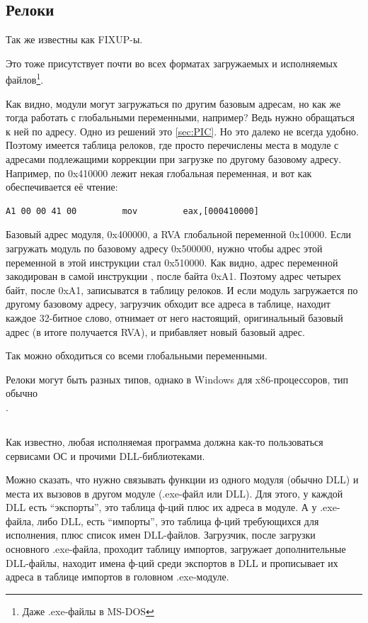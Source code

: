 \subsection{Релоки}

Так же известны как FIXUP-ы.

Это тоже присутствует почти во всех форматах загружаемых и исполняемых файлов\footnote{Даже .exe-файлы в MS-DOS}.

Как видно, модули могут загружаться по другим базовым адресам, но как же тогда работать с глобальными переменными,
например? Ведь нужно обращаться к ней по адресу. Одно из решений это \PICcode\ref{sec:PIC}. 
Но это далеко не всегда удобно.
Поэтому имеется таблица релоков, где просто перечислены места в модуле с адресами подлежащими коррекции при загрузке
по другому базовому адресу.
Например, по 0x410000 лежит некая глобальная переменная, и вот как обеспечивается её чтение:

\begin{lstlisting}
A1 00 00 41 00         mov         eax,[000410000]
\end{lstlisting}

Базовый адрес модуля, 0x400000, а \ac{RVA} глобальной переменной 0x10000. Если загружать модуль по базовому адресу
0x500000, нужно чтобы адрес этой переменной в этой инструкции стал 0x510000. Как видно, адрес переменной закодирован
в самой инструкции , после байта 0xA1. Поэтому адрес четырех байт, после 0xA1, записыватся в таблицу релоков.
И если модуль загружается по другому базовому адресу, загрузчик обходит все адреса в таблице, находит каждое 32-битное
слово, отнимает от него настоящий, оригинальный базовый адрес (в итоге получается \ac{RVA}), и прибавляет новый базовый адрес.

Так можно обходиться со всеми глобальными переменными.

Релоки могут быть разных типов, однако в Windows для x86-процессоров, тип обычно \\
.

\subsection{}

Как известно, любая исполняемая программа должна как-то пользоваться сервисами \ac{ОС} и прочими DLL-библиотеками.

Можно сказать, что нужно связывать функции из одного модуля (обычно DLL) и места их вызовов в 
другом модуле (.exe-файл или DLL). 
Для этого, у каждой DLL есть ``экспорты'', это таблица ф-ций плюс их адреса в модуле.
А у .exe-файла, либо DLL, есть ``импорты'', это таблица ф-ций требующихся для исполнения, плюс список имен DLL-файлов.
Загрузчик, после загрузки основного .exe-файла, проходит таблицу импортов, загружает дополнительные DLL-файлы, 
находит имена ф-ций среди экспортов в DLL и прописывает их адреса в таблице импортов в головном .exe-модуле.


